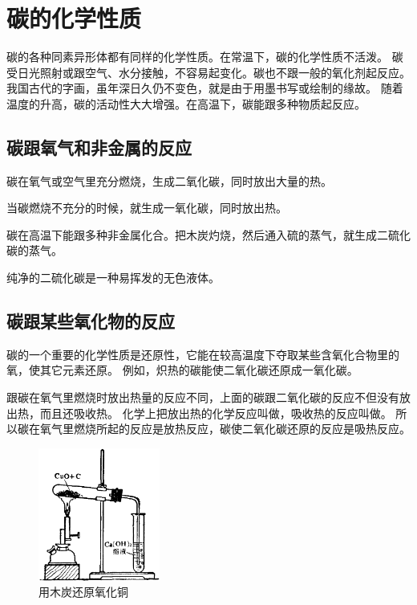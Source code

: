\section{碳的化学性质}\label{sec:3-3}

碳的各种同素异形体都有同样的化学性质。在常温下，碳的化学性质不活泼。
碳受日光照射或跟空气、水分接触，不容易起变化。碳也不跟一般的氧化剂起反应。
我国古代的字画，虽年深日久仍不变色，就是由于用墨书写或绘制的缘故。
随着温度的升高，碳的活动性大大增强。在高温下，碳能跟多种物质起反应。

\subsection{碳跟氧气和非金属的反应}

碳在氧气或空气里充分燃烧，生成二氧化碳，同时放出大量的热。
\begin{fangchengshi}
\end{fangchengshi}

当碳燃烧不充分的时候，就生成一氧化碳，同时放出热。
\begin{fangchengshi}
\end{fangchengshi}

碳在高温下能跟多种非金属化合。把木炭灼烧，然后通入硫的蒸气，就生成二硫化碳的蒸气。
\begin{fangchengshi}
\end{fangchengshi}

纯净的二硫化碳是一种易挥发的无色液体。


\subsection{碳跟某些氧化物的反应}

碳的一个重要的化学性质是还原性，它能在较高温度下夺取某些含氧化合物里的氧，使其它元素还原。
例如，炽热的碳能使二氧化碳还原成一氧化碳。
\begin{fangchengshi}
\end{fangchengshi}

跟碳在氧气里燃烧时放出热量的反应不同，上面的碳跟二氧化碳的反应不但没有放出热，而且还吸收热。
化学上把放出热的化学反应叫做，吸收热的反应叫做。
所以碳在氧气里燃烧所起的反应是放热反应，碳使二氧化碳还原的反应是吸热反应。

\begin{figure}
    \centering
    \includegraphics[width=4cm]{../pic/czhx1-ch3-4}
    \caption{用木炭还原氧化铜}\label{fig:3-4}
\end{figure}

